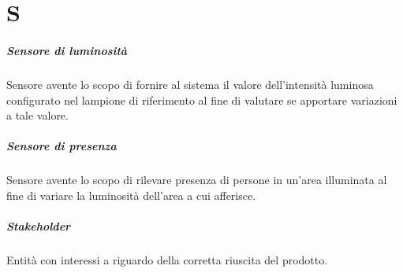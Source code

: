 \chapter{S}

\paragraph*{Sensore di luminosità}
Sensore avente lo scopo di fornire al sistema il valore dell'intensità luminosa configurato nel lampione di riferimento al fine di valutare se apportare variazioni a tale valore.

\paragraph*{Sensore di presenza}
Sensore avente lo scopo di rilevare presenza di persone in un'area illuminata al fine di variare la luminosità dell'area a cui afferisce.

\paragraph*{Stakeholder}
Entità con interessi a riguardo della corretta riuscita del prodotto.